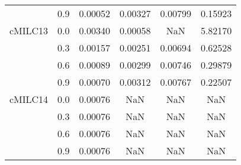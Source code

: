 \begin{longtable}{cccccc}
        & 0.9 & 0.00052 & 0.00327 & 0.00799 & 0.15923 \\
cMILC13 & 0.0 & 0.00340 & 0.00058 & NaN & 5.82170 \\
        & 0.3 & 0.00157 & 0.00251 & 0.00694 & 0.62528 \\
        & 0.6 & 0.00089 & 0.00299 & 0.00746 & 0.29879 \\
        & 0.9 & 0.00070 & 0.00312 & 0.00767 & 0.22507 \\
cMILC14 & 0.0 & 0.00076 & NaN & NaN & NaN \\
        & 0.3 & 0.00076 & NaN & NaN & NaN \\
        & 0.6 & 0.00076 & NaN & NaN & NaN \\
        & 0.9 & 0.00076 & NaN & NaN & NaN \\
\end{longtable}
